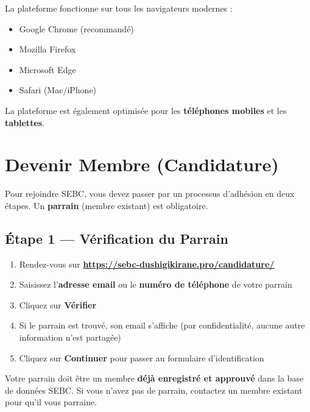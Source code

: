 \documentclass[12pt,a4paper]{article}
\begin{document}
\begin{infobox}
La plateforme fonctionne sur tous les navigateurs modernes :
\begin{itemize}[leftmargin=1.5em]
    \item Google Chrome (recommandé)
    \item Mozilla Firefox
    \item Microsoft Edge
    \item Safari (Mac/iPhone)
\end{itemize}
La plateforme est également optimisée pour les \textbf{téléphones mobiles} et les \textbf{tablettes}.
\end{infobox}

\section{Devenir Membre (Candidature)}

Pour rejoindre SEBC, vous devez passer par un processus d'adhésion en deux étapes. Un \textbf{parrain} (membre existant) est obligatoire.

\subsection{Étape 1 — Vérification du Parrain}

\begin{etapebox}[Procédure]
\begin{enumerate}[leftmargin=1.5em]
    \item Rendez-vous sur \textbf{\url{https://sebc-dushigikirane.pro/candidature/}}
    \item Saisissez l'\textbf{adresse email} ou le \textbf{numéro de téléphone} de votre parrain
    \item Cliquez sur \textbf{Vérifier}
    \item Si le parrain est trouvé, son email s'affiche (par confidentialité, aucune autre information n'est partagée)
    \item Cliquez sur \textbf{Continuer} pour passer au formulaire d'identification
\end{enumerate}
\end{etapebox}

\begin{attentionbox}[Important]
Votre parrain doit être un membre \textbf{déjà enregistré et approuvé} dans la base de données SEBC. Si vous n'avez pas de parrain, contactez un membre existant pour qu'il vous parraine.
\end{attentionbox}
\end{document}
